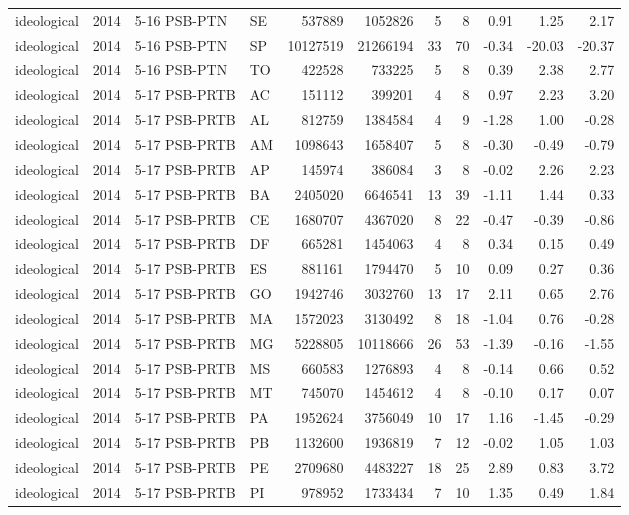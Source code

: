 \begin{landscape}
\begin{longtable}{lllL{1.4cm}rrrrrrr}
ideological & 2014 & 5-16 PSB-PTN & SE & 537889 & 1052826 & 5 & 8 & 0.91 & 1.25 & 2.17 \\
ideological & 2014 & 5-16 PSB-PTN & SP & 10127519 & 21266194 & 33 & 70 & -0.34 & -20.03 & -20.37 \\
ideological & 2014 & 5-16 PSB-PTN & TO & 422528 & 733225 & 5 & 8 & 0.39 & 2.38 & 2.77 \\
ideological & 2014 & 5-17 PSB-PRTB & AC & 151112 & 399201 & 4 & 8 & 0.97 & 2.23 & 3.20 \\
ideological & 2014 & 5-17 PSB-PRTB & AL & 812759 & 1384584 & 4 & 9 & -1.28 & 1.00 & -0.28 \\
ideological & 2014 & 5-17 PSB-PRTB & AM & 1098643 & 1658407 & 5 & 8 & -0.30 & -0.49 & -0.79 \\
ideological & 2014 & 5-17 PSB-PRTB & AP & 145974 & 386084 & 3 & 8 & -0.02 & 2.26 & 2.23 \\
ideological & 2014 & 5-17 PSB-PRTB & BA & 2405020 & 6646541 & 13 & 39 & -1.11 & 1.44 & 0.33 \\
ideological & 2014 & 5-17 PSB-PRTB & CE & 1680707 & 4367020 & 8 & 22 & -0.47 & -0.39 & -0.86 \\
ideological & 2014 & 5-17 PSB-PRTB & DF & 665281 & 1454063 & 4 & 8 & 0.34 & 0.15 & 0.49 \\
ideological & 2014 & 5-17 PSB-PRTB & ES & 881161 & 1794470 & 5 & 10 & 0.09 & 0.27 & 0.36 \\
ideological & 2014 & 5-17 PSB-PRTB & GO & 1942746 & 3032760 & 13 & 17 & 2.11 & 0.65 & 2.76 \\
ideological & 2014 & 5-17 PSB-PRTB & MA & 1572023 & 3130492 & 8 & 18 & -1.04 & 0.76 & -0.28 \\
ideological & 2014 & 5-17 PSB-PRTB & MG & 5228805 & 10118666 & 26 & 53 & -1.39 & -0.16 & -1.55 \\
ideological & 2014 & 5-17 PSB-PRTB & MS & 660583 & 1276893 & 4 & 8 & -0.14 & 0.66 & 0.52 \\
ideological & 2014 & 5-17 PSB-PRTB & MT & 745070 & 1454612 & 4 & 8 & -0.10 & 0.17 & 0.07 \\
ideological & 2014 & 5-17 PSB-PRTB & PA & 1952624 & 3756049 & 10 & 17 & 1.16 & -1.45 & -0.29 \\
ideological & 2014 & 5-17 PSB-PRTB & PB & 1132600 & 1936819 & 7 & 12 & -0.02 & 1.05 & 1.03 \\
ideological & 2014 & 5-17 PSB-PRTB & PE & 2709680 & 4483227 & 18 & 25 & 2.89 & 0.83 & 3.72 \\
ideological & 2014 & 5-17 PSB-PRTB & PI & 978952 & 1733434 & 7 & 10 & 1.35 & 0.49 & 1.84 \\

\end{longtable}
\end{landscape}
